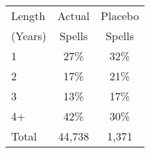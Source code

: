 \begin{tabular}{lcc}
\toprule
Length & Actual & Placebo \\
(Years) & Spells & Spells \\
\midrule
1 & 27\% & 32\% \\
2 & 17\% & 21\% \\
3 & 13\% & 17\% \\
4+ & 42\% & 30\% \\
Total &       44,738 &        1,371 \\
\bottomrule
\end{tabular}
